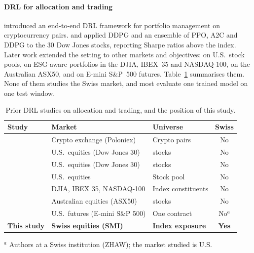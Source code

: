 \documentclass[11pt,a4paper]{article}
\begin{document}
\paragraph{DRL for allocation and trading} \citet{jiang2017} introduced an end-to-end DRL framework for portfolio management on cryptocurrency pairs. \citet{xiong2018} and \citet{yang2020} applied DDPG and an ensemble of PPO, A2C and DDPG to the 30 Dow Jones stocks, reporting Sharpe ratios above the index. Later work extended the setting to other markets and objectives: \citet{hieu2020} on U.S.\ stock pools, \citet{garrido2023} on ESG-aware portfolios in the DJIA, IBEX~35 and NASDAQ-100, \citet{wu2024} on the Australian ASX50, and \citet{hirsa2021} on E-mini S\&P~500 futures. Table~\ref{tab:lit} summarises them. None of them studies the Swiss market, and most evaluate one trained model on one test window.

\begin{table}[ht]
\centering\small
\caption{Prior DRL studies on allocation and trading, and the position of this study.}
\label{tab:lit}
\begin{tabularx}{\linewidth}{@{}>{\raggedright\arraybackslash}p{3.6cm}>{\raggedright\arraybackslash}X>{\raggedright\arraybackslash}p{3.0cm}c@{}}
\toprule
\textbf{Study} & \textbf{Market} & \textbf{Universe} & \textbf{Swiss} \\
\midrule
\citet{jiang2017} & Crypto exchange (Poloniex) & Crypto pairs & No \\
\citet{xiong2018} & U.S.\ equities (Dow Jones 30) & 30 stocks & No \\
\citet{yang2020} & U.S.\ equities (Dow Jones 30) & 30 stocks & No \\
\citet{hieu2020} & U.S.\ equities & Stock pool & No \\
\citet{garrido2023} & DJIA, IBEX 35, NASDAQ-100 & Index constituents & No \\
\citet{wu2024} & Australian equities (ASX50) & 50 stocks & No \\
\citet{hirsa2021} & U.S.\ futures (E-mini S\&P 500) & One contract & No$^{a}$ \\
\midrule
\textbf{This study} & \textbf{Swiss equities (SMI)} & \textbf{Index exposure} & \textbf{Yes} \\
\bottomrule
\end{tabularx}
\par\smallskip\footnotesize $^{a}$ Authors at a Swiss institution (ZHAW); the market studied is U.S.
\end{table}
\end{document}
